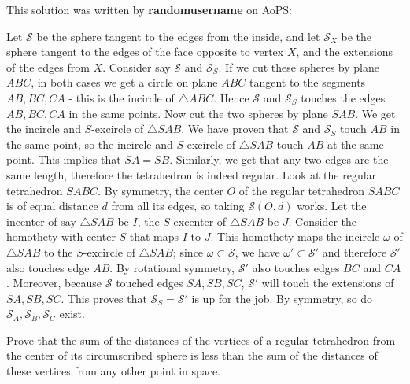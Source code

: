 \begin{solution}
	This solution was written by \textbf{randomusername} on AoPS:
	\begin{tasks}
		\task Let $\mathcal{S}$ be the sphere tangent to the edges from the inside, and let $\mathcal{S}_X$ be the sphere tangent to the edges of the face opposite to vertex $X$, and the extensions of the edges from $X$.
		Consider say $\mathcal{S}$ and $\mathcal{S}_S$. If we cut these spheres by plane $ABC$, in both cases we get a circle on plane $ABC$ tangent to the segments $AB,BC,CA$ - this is the incircle of $\triangle ABC$. Hence $\mathcal{S}$ and $\mathcal{S}_S$ touches the edges $AB,BC,CA$ in the same points.
		Now cut the two spheres by plane $SAB$. We get the incircle and $S$-excircle of $\triangle SAB$. We have proven that $\mathcal{S}$ and $\mathcal{S}_S$ touch $AB$ in the same point, so the incircle and $S$-excircle of $\triangle SAB$ touch $AB$ at the same point. This implies that $SA=SB$.
		Similarly, we get that any two edges are the same length, therefore the tetrahedron is indeed regular.
		\task Look at the regular tetrahedron $SABC$.
		By symmetry, the center $O$ of the regular tetrahedron $SABC$ is of equal distance $d$ from all its edges, so taking $\mathcal{S}(O,d)$ works.
		Let the incenter of say $\triangle SAB$ be $I$, the $S$-excenter of $\triangle SAB$ be $J$. Consider the homothety with center $S$ that maps $I$ to $J$. This homothety maps the incircle $\omega$ of $\triangle SAB$ to the $S$-excircle of $\triangle SAB$; since $\omega\subset \mathcal{S}$, we have $\omega'\subset\mathcal{S}'$ and therefore $\mathcal{S}'$ also touches edge $AB$. By rotational symmetry, $\mathcal{S}'$ also touches edges $BC$ and $CA$. Moreover, because $\mathcal{S}$ touched edges $SA,SB,SC$, $\mathcal{S}'$ will touch the extensions of $SA,SB,SC$. This proves that $\mathcal{S}_S=\mathcal{S}'$ is up for the job.
		By symmetry, so do $\mathcal{S}_A,\mathcal{S}_B,\mathcal{S}_C$ exist.
	\end{tasks}
\end{solution}




\begin{question}[name={1966 International Mathematical Olympiad}]
	Prove that the sum of the distances of the vertices of a regular tetrahedron from the center of its circumscribed sphere is less than the sum of the distances of these vertices from any other point in space.
\end{question}


